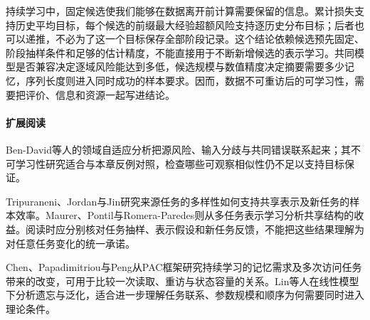 持续学习中，固定候选使我们能够在数据离开前计算需要保留的信息。累计损失支持历史平均目标，每个候选的前缀最大经验超额风险支持逐历史分布目标；后者也可以递推，不必为了这一个目标保存全部阶段记录。这个结论依赖候选预先固定、阶段抽样条件和足够的估计精度，不能直接用于不断新增候选的表示学习。共同模型是否兼容决定逐域风险能达到多低，候选规模与数值精度决定摘要需要多少记忆，序列长度则进入同时成功的样本要求。因而，数据不可重访后的可学习性，需要把评价、信息和资源一起写进结论。

\paragraph{扩展阅读}
Ben-David等人的领域自适应分析把源风险、输入分歧与共同错误联系起来；其不可学习性研究适合与本章反例对照，检查哪些可观察相似性仍不足以支持目标保证。

Tripuraneni、Jordan与Jin研究来源任务的多样性如何支持共享表示及新任务的样本效率。Maurer、Pontil与Romera-Paredes则从多任务表示学习分析共享结构的收益。阅读时应分别核对任务抽样、表示假设和新任务反馈，不能把这些结果理解为对任意任务变化的统一承诺。

Chen、Papadimitriou与Peng从PAC框架研究持续学习的记忆需求及多次访问任务带来的改变，可用于比较一次读取、重访与状态容量的关系。Lin等人在线性模型下分析遗忘与泛化，适合进一步理解任务联系、参数规模和顺序为何需要同时进入理论条件。
